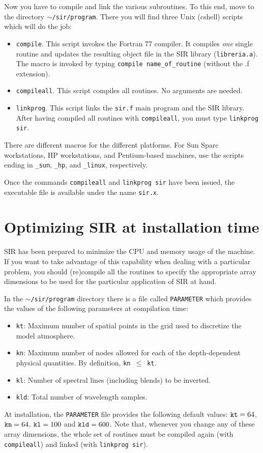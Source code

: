 Now you have to compile and link the various subroutines. To this end,
move to the directory {\tt $\sim$/sir/program}. There you will find
three Unix (cshell) scripts which will do the job:
\begin{itemize}
\item {\tt compile}. This script invokes the Fortran 77 compiler. It
compiles {\em one} single routine and updates the resulting object file in 
the SIR library ({\tt libreria.a}). The macro is invoked by typing
{\tt compile name\_of\_routine} (without the .f extension).
\item {\tt compileall}. This script compiles all routines. No arguments
are needed.
\item {\tt linkprog}. This script links the {\tt sir.f} main program and
the SIR library. After having compiled all routines with 
{\tt compileall}, you must type {\tt linkprog sir}. 
\end{itemize}
There are different macros for the different platforms. For Sun Sparc 
workstations, HP workstations, and Pentium-based machines, use the
scripts ending in {\tt \_sun}, {\tt \_hp}, and {\tt \_linux}, respectively.

Once the commands {\tt compileall} and {\tt linkprog sir} have been
issued, the executable file is available under the name {\tt sir.x}. 

\section{Optimizing SIR at installation time} 
SIR has been prepared to minimize the CPU and memory usage of the
machine. If you want to take advantage of this capability when dealing 
with a particular problem, you should (re)compile all the routines 
to specify the appropriate array dimensions to be used for the particular 
application of SIR at hand.   

In the {\tt $\sim$/sir/program} directory there is a file called 
{\tt PARAMETER} which provides the values of the following 
parameters at compilation time:
\begin{itemize}
\item {\tt kt}: Maximum number of spatial points in the grid used to discretize
the model atmosphere. 
\item {\tt kn}: Maximum number of nodes allowed for each of the depth-dependent
physical quantities. By definition, {\tt kn}~$\leq$~{\tt kt}. 
\item {\tt kl}: Number of spectral lines (including blends) to be inverted.
\item {\tt kld}: Total number of wavelength samples.
\end{itemize}
At installation, the {\tt PARAMETER} file provides the following
default values:  ${\tt kt} =64$, ${\tt kn} = 64$, ${\tt kl}=100$ and
${\tt kld} = 600$. Note that, whenever you change any of these
array dimensions, the whole set of routines must be compiled again 
(with {\tt compileall}) and linked (with {\tt linkprog sir}).

